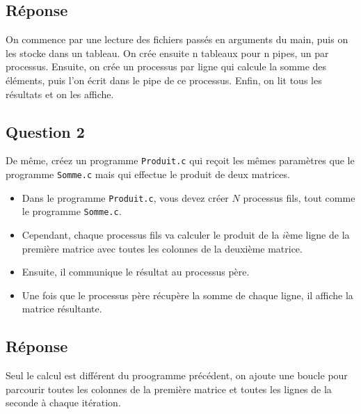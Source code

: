 \documentclass[
	12pt, %
]{fphw}
\begin{document}
\subsection*{Réponse}

On commence par une lecture des fichiers passés en arguments du main, puis on les stocke dans un tableau.
On crée ensuite n tableaux pour n pipes, un par processus.
Ensuite, on crée un processus par ligne qui calcule la somme des éléments, puis l'on écrit dans le pipe de ce processus.
Enfin, on lit tous les résultats et on les affiche.

\subsection*{Question 2}
\begin{problem}
De même, créez un programme \texttt{Produit.c} qui reçoit les mêmes paramètres que le programme \texttt{Somme.c} mais qui effectue le produit de deux matrices. 
\begin{itemize}
	\item Dans le programme \texttt{Produit.c}, vous devez créer $N$ processus fils, tout comme le programme \texttt{Somme.c}.
	\item Cependant, chaque processus fils va calculer le produit de la $i$ème ligne de la première matrice avec toutes les colonnes de la deuxième matrice.
	\item Ensuite, il communique le résultat au processus père.
	\item Une fois que le processus père récupère la somme de chaque ligne, il affiche la matrice résultante.
\end{itemize}
\end{problem}
\subsection*{Réponse}

Seul le calcul est différent du proogramme précédent, on ajoute une boucle pour parcourir toutes les colonnes de la première matrice et toutes les lignes de la seconde à chaque itération.

\end{document}
